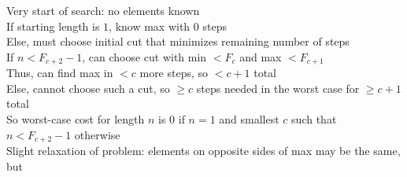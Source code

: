 \documentclass{article}
\begin{document}
Very start of search: no elements known \\
If starting length is $1$, know max with $0$ steps \\
Else, must choose initial cut that minimizes remaining number of steps \\
If $n < F_{c+2}-1$, can choose cut with min $< F_c$ and max $< F_{c+1}$ \\
Thus, can find max in $< c$ more steps, so $< c+1$ total \\
Else, cannot choose such a cut, so $\geq c$ steps needed in the worst case
for $\geq c+1$ total \\
So worst-case cost for length $n$ is
$0$ if $n = 1$ and smallest $c$ such that $n < F_{c+2}-1$ otherwise \\

Slight relaxation of problem: 
elements on opposite sides of max may be the same,
but 
\end{document}
